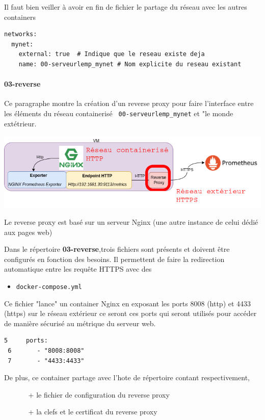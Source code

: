 \documentclass[french, 12pt]{article}%
\newcommand{\itemE}{\item[$\bullet$]}
\begin{document}
Il faut bien veiller à avoir en fin de fichier le partage du réseau avec les autres containers 

\begin{lstlisting}[style = commande]
networks:
  mynet:
    external: true  # Indique que le reseau existe deja
    name: 00-serveurlemp_mynet # Nom explicite du reseau existant
\end{lstlisting}

\paragraph{03-reverse}
Ce paragraphe montre la création d'un reverse proxy pour faire l'interface entre les éléments du réseau containerisé \verb? 00-serveurlemp_mynet? et "le monde extétrieur.
\begin{center}
\includegraphics[scale=0.5]{./ressource/etapeReverse.png}
\end{center}

Le reverse proxy est basé sur un serveur Nginx (une autre instance de celui dédié aux pages web)

Dans le répertoire \textbf{03-reverse},trois fichiers sont présents et doivent être configurés en fonction des besoins. Il permettent de faire la redirection automatique entre les requête HTTPS avec des 

\begin{itemize}
\itemE \verb?docker-compose.yml?
\end{itemize}
Ce fichier "lance" un container Nginx en exposant les ports 8008 (http) et 4433 (https) sur le réseau extérieur ce seront ces ports qui seront utilisés pour accéder de manière sécurisé au métrique du serveur web.


\begin{lstlisting}[style = commande]
 5     ports:
 6       - "8008:8008"
 7       - "4433:4433"
\end{lstlisting}

De plus, ce container partage avec l'hote de répertoire contant respectivement, 
\begin{itemize}
\item[ ] 
\begin{itemize}
\item[+] le fichier de configuration du reverse proxy 
\item[+] la clefs et le certificat du reverse proxy
\end{itemize}
\end{itemize}
\end{document}
